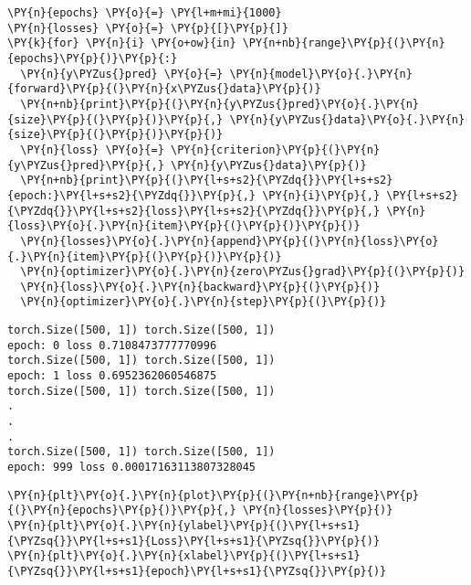     \begin{tcolorbox}[breakable, size=fbox, boxrule=1pt, pad at break*=1mm,colback=cellbackground, colframe=cellborder]
\begin{Verbatim}[commandchars=\\\{\}]
\PY{n}{epochs} \PY{o}{=} \PY{l+m+mi}{1000}
\PY{n}{losses} \PY{o}{=} \PY{p}{[}\PY{p}{]}
\PY{k}{for} \PY{n}{i} \PY{o+ow}{in} \PY{n+nb}{range}\PY{p}{(}\PY{n}{epochs}\PY{p}{)}\PY{p}{:}
  \PY{n}{y\PYZus{}pred} \PY{o}{=} \PY{n}{model}\PY{o}{.}\PY{n}{forward}\PY{p}{(}\PY{n}{x\PYZus{}data}\PY{p}{)}
  \PY{n+nb}{print}\PY{p}{(}\PY{n}{y\PYZus{}pred}\PY{o}{.}\PY{n}{size}\PY{p}{(}\PY{p}{)}\PY{p}{,} \PY{n}{y\PYZus{}data}\PY{o}{.}\PY{n}{size}\PY{p}{(}\PY{p}{)}\PY{p}{)}
  \PY{n}{loss} \PY{o}{=} \PY{n}{criterion}\PY{p}{(}\PY{n}{y\PYZus{}pred}\PY{p}{,} \PY{n}{y\PYZus{}data}\PY{p}{)}
  \PY{n+nb}{print}\PY{p}{(}\PY{l+s+s2}{\PYZdq{}}\PY{l+s+s2}{epoch:}\PY{l+s+s2}{\PYZdq{}}\PY{p}{,} \PY{n}{i}\PY{p}{,} \PY{l+s+s2}{\PYZdq{}}\PY{l+s+s2}{loss}\PY{l+s+s2}{\PYZdq{}}\PY{p}{,} \PY{n}{loss}\PY{o}{.}\PY{n}{item}\PY{p}{(}\PY{p}{)}\PY{p}{)}
  \PY{n}{losses}\PY{o}{.}\PY{n}{append}\PY{p}{(}\PY{n}{loss}\PY{o}{.}\PY{n}{item}\PY{p}{(}\PY{p}{)}\PY{p}{)}
  \PY{n}{optimizer}\PY{o}{.}\PY{n}{zero\PYZus{}grad}\PY{p}{(}\PY{p}{)}
  \PY{n}{loss}\PY{o}{.}\PY{n}{backward}\PY{p}{(}\PY{p}{)}
  \PY{n}{optimizer}\PY{o}{.}\PY{n}{step}\PY{p}{(}\PY{p}{)}
\end{Verbatim}
\end{tcolorbox}

    \begin{Verbatim}[commandchars=\\\{\}]
torch.Size([500, 1]) torch.Size([500, 1])
epoch: 0 loss 0.7108473777770996
torch.Size([500, 1]) torch.Size([500, 1])
epoch: 1 loss 0.6952362060546875
torch.Size([500, 1]) torch.Size([500, 1])
.
.
.
torch.Size([500, 1]) torch.Size([500, 1])
epoch: 999 loss 0.00017163113807328045
    \end{Verbatim}

    \begin{tcolorbox}[breakable, size=fbox, boxrule=1pt, pad at break*=1mm,colback=cellbackground, colframe=cellborder]
\begin{Verbatim}[commandchars=\\\{\}]
\PY{n}{plt}\PY{o}{.}\PY{n}{plot}\PY{p}{(}\PY{n+nb}{range}\PY{p}{(}\PY{n}{epochs}\PY{p}{)}\PY{p}{,} \PY{n}{losses}\PY{p}{)}
\PY{n}{plt}\PY{o}{.}\PY{n}{ylabel}\PY{p}{(}\PY{l+s+s1}{\PYZsq{}}\PY{l+s+s1}{Loss}\PY{l+s+s1}{\PYZsq{}}\PY{p}{)}
\PY{n}{plt}\PY{o}{.}\PY{n}{xlabel}\PY{p}{(}\PY{l+s+s1}{\PYZsq{}}\PY{l+s+s1}{epoch}\PY{l+s+s1}{\PYZsq{}}\PY{p}{)}
\end{Verbatim}
\end{tcolorbox}

